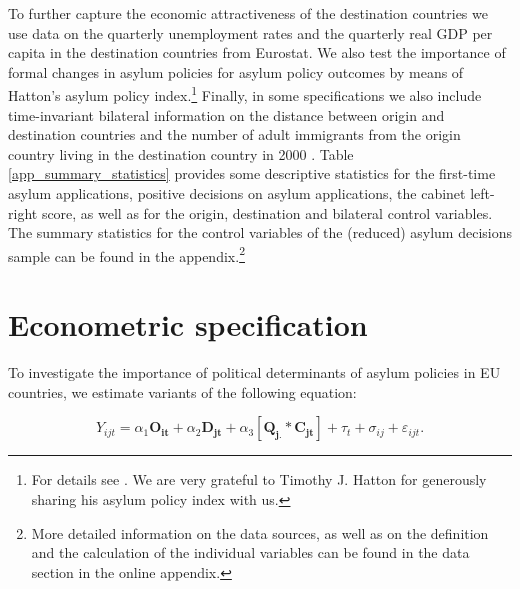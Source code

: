 \documentclass[a4paper,12pt]{article}
\begin{document}
To further capture the economic attractiveness of the destination countries we use data on the quarterly unemployment rates and the quarterly real GDP per capita in the destination countries from Eurostat. We also test the importance of formal changes in asylum policies for asylum policy outcomes by means of Hatton's asylum policy index.\footnote{For details see \citet{hatton2009}. We are very grateful to Timothy J. Hatton for generously sharing his asylum policy index with us.} Finally, in some specifications we also include time-invariant bilateral information on the distance between origin and destination countries \citep{distance2017} and the number of adult immigrants from the origin country living in the destination country in 2000 \citep{Artucc2015}. Table \ref{app_summary_statistics} provides some descriptive statistics for the first-time asylum applications, 
positive decisions on asylum applications,
the cabinet left-right score, as well as for the origin, destination and bilateral control variables. The summary statistics for the control variables of the (reduced) asylum decisions sample can be found in the appendix.\footnote{More detailed information on the data sources, as well as on the definition and the calculation of the individual variables can be found in the data section in the online appendix.}




\section{Econometric specification} \label{sec:econometric}

To investigate the importance of political determinants of asylum policies in EU countries, we estimate variants of the following equation:

\begin{equation}
Y_{ijt} =\alpha_1 \mathbf{O_{it}} + \alpha_2 \mathbf{D_{jt}} + \alpha_3 [\mathbf{Q_{j.}} *  \mathbf{C_{jt}}] + \tau_t + \sigma_{ij} +  \varepsilon_{ijt}.
\end{equation}
\end{document}
